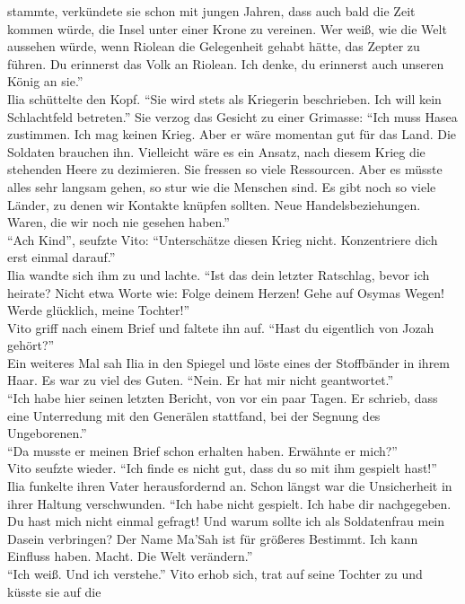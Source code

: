 stammte, verkündete sie schon mit jungen Jahren, dass auch bald die Zeit kommen würde, die Insel 
unter einer Krone zu vereinen. Wer weiß, wie die Welt aussehen würde, wenn Riolean die Gelegenheit 
gehabt hätte, das Zepter zu führen. Du erinnerst das Volk an Riolean. Ich denke, du erinnerst auch 
unseren König an sie.''\\
Ilia schüttelte den Kopf. ``Sie wird stets als Kriegerin beschrieben. Ich will kein Schlachtfeld 
betreten.'' Sie verzog das Gesicht zu einer Grimasse: ``Ich muss Hasea zustimmen. Ich mag keinen 
Krieg. Aber er wäre momentan gut für das Land. Die Soldaten brauchen ihn. Vielleicht wäre es ein 
Ansatz, nach diesem Krieg die stehenden Heere zu dezimieren. Sie fressen so viele Ressourcen. Aber 
es müsste alles sehr langsam gehen, so stur wie die Menschen sind. Es gibt noch so viele Länder, zu 
denen wir Kontakte knüpfen sollten. Neue Handelsbeziehungen. Waren, die wir noch nie gesehen 
haben.''\\
``Ach Kind'', seufzte Vito: ``Unterschätze diesen Krieg nicht. Konzentriere dich erst einmal 
darauf.''\\
Ilia wandte sich ihm zu und lachte. ``Ist das dein letzter Ratschlag, bevor ich heirate? Nicht 
etwa Worte wie: Folge deinem Herzen! Gehe auf Osymas Wegen! Werde glücklich, meine Tochter!''\\
Vito griff nach einem Brief und faltete ihn auf. ``Hast du eigentlich von Jozah gehört?''\\
Ein weiteres Mal sah Ilia in den Spiegel und löste eines der Stoffbänder in ihrem Haar. 
Es war zu viel des Guten. ``Nein. Er hat mir nicht geantwortet.''\\
``Ich habe hier seinen letzten Bericht, von vor ein paar Tagen. Er schrieb, dass eine 
Unterredung mit den Generälen stattfand, bei der Segnung des Ungeborenen.''\\
``Da musste er meinen Brief schon erhalten haben. Erwähnte er mich?''\\
Vito seufzte wieder. ``Ich finde es nicht gut, dass du so mit ihm gespielt hast!''\\
Ilia funkelte ihren Vater herausfordernd an. Schon längst war die Unsicherheit in ihrer Haltung 
verschwunden. ``Ich habe nicht gespielt. Ich habe dir nachgegeben. Du hast 
mich nicht einmal gefragt! Und warum sollte ich als Soldatenfrau mein Dasein verbringen? Der 
Name Ma'Sah ist für größeres Bestimmt. Ich kann Einfluss haben. Macht. Die Welt verändern.''\\
``Ich weiß. Und ich verstehe.'' Vito erhob sich, trat auf seine Tochter zu und küsste sie auf die 
